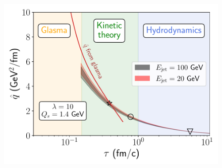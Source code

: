 \documentclass[aspectratio=169,11pt,usenames,dvipsnames]{beamer}
\begin{document}
\begin{frame}
\begin{columns}[onlytextwidth,t]
\begin{figure}[!hbt]
            \includegraphics[width=0.8\columnwidth]{images/2023-03-07-16-41-35_qhat_appetizer_glasma_comparison_493.pdf}
        \end{figure}
    \end{columns}   


\end{frame}
\end{document}
